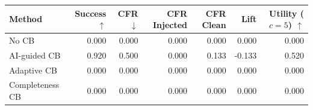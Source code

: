 \begin{tabular}{lrrrrrr}
\toprule
Method & Success $\uparrow$ & CFR $\downarrow$ & CFR Injected & CFR Clean & Lift & Utility ($c=5$) $\uparrow$ \\
\midrule
No CB & 0.000 & 0.000 & 0.000 & 0.000 & 0.000 & 0.000 \\
AI-guided CB & 0.920 & 0.500 & 0.000 & 0.133 & -0.133 & 0.520 \\
Adaptive CB & 0.000 & 0.000 & 0.000 & 0.000 & 0.000 & 0.000 \\
Completeness CB & 0.000 & 0.000 & 0.000 & 0.000 & 0.000 & 0.000 \\
\bottomrule
\end{tabular}
